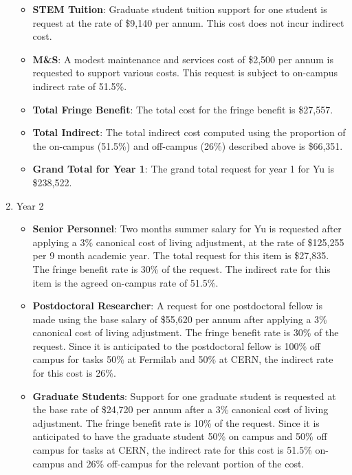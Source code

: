 \begin{enumerate}
\begin{itemize}[noitemsep,nolistsep]
\item {{\bf STEM Tuition}: Graduate student tuition support for one student is request at the rate of \$9,140 per annum.  This cost does not incur indirect cost.}

\item {{\bf M\&S}: A modest maintenance and services cost of \$2,500 per annum is requested to support various costs.   This request is subject to on-campus indirect rate of 51.5\%.}

\item {{\bf Total Fringe Benefit}: The total cost for the fringe benefit is \$27,557.}

\item {{\bf Total Indirect}: The total indirect cost computed using the proportion of the on-campus (51.5\%) and off-campus (26\%) described above is \$66,351.}

\item {{\bf Grand Total for Year 1}: The grand total request for year 1 for Yu is \$238,522.}

\end{itemize}

\item{Year 2}
\begin{itemize}[noitemsep,nolistsep]
\item{{\bf Senior Personnel}: Two months summer salary for Yu is requested after applying a 3\% canonical cost of living adjustment, at the rate of \$125,255 per 9 month academic year.  The total request for this item is \$27,835.   The fringe benefit rate is 30\% of the request.  The indirect rate for this item is the agreed on-campus rate of 51.5\%.}

\item {{\bf Postdoctoral Researcher}: A request for one postdoctoral fellow is made using the base salary of \$55,620 per annum after applying a 3\% canonical cost of living adjustment.  The fringe benefit rate is 30\% of the request.  Since it is anticipated to the postdoctoral fellow is 100\% off campus for tasks 50\% at Fermilab and 50\% at CERN, the indirect rate for this cost is 26\%.} 

\item{{\bf Graduate Students}: Support for one graduate student is requested at the base rate of \$24,720 per annum after a 3\% canonical cost of living adjustment.   The fringe benefit rate is 10\% of the request.  Since it is anticipated to have the graduate student 50\% on campus and 50\% off campus for tasks at CERN, the indirect rate for this cost is 51.5\% on-campus and 26\% off-campus for the relevant portion of the cost. }


\end{itemize}
\end{enumerate}
